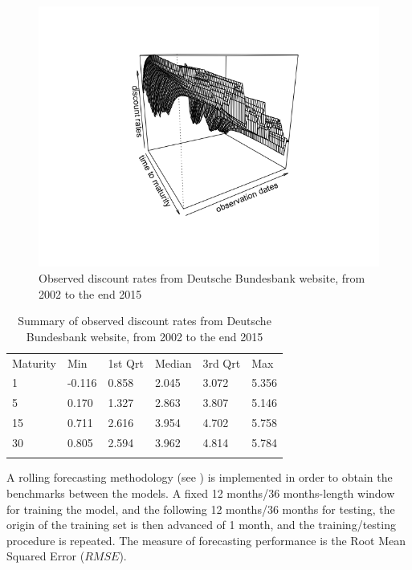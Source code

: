 \begin{figure}[!htb]
\centering
\includegraphics[width=14cm]{gfx/chapter-krls-models/bundesbank_dR.png}
\caption{Observed discount rates from Deutsche Bundesbank website, from 2002 to the end 2015}
\label{db_zerorates}
\end{figure}

\begin{table}
\begin{center}
\caption{Summary of observed discount rates from Deutsche Bundesbank website, from 2002 to the end 2015}
\label{tab:summary_db_zeros}       %
\begin{tabular}{llllll}
\hline\noalign{\smallskip}
Maturity & Min & 1st Qrt  & Median  & 3rd Qrt  & Max  \\
\noalign{\smallskip}\hline\noalign{\smallskip}
  1 & -0.116 & 0.858 & 2.045 & 3.072 & 5.356 \\
  5 & 0.170 & 1.327 & 2.863 & 3.807 & 5.146\\
  15 & 0.711 & 2.616 & 3.954 & 4.702 & 5.758\\
  30 & 0.805 & 2.594 & 3.962 & 4.814 & 5.784\\
\noalign{\smallskip}\hline
\end{tabular}
\end{center}
\end{table}

A rolling forecasting methodology (see \cite{bergmeir2015note}) is implemented in order to obtain the benchmarks between the models. A fixed 12 months/36 months-length window for training the model, and the following 12 months/36 months for testing, the origin of the training set is then advanced of 1 month, and the training/testing procedure is repeated. The measure of forecasting performance is the Root Mean Squared Error ($RMSE$).

